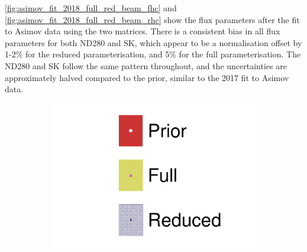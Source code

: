 \autoref{fig:asimov_fit_2018_full_red_beam_fhc} and \autoref{fig:asimov_fit_2018_full_red_beam_rhc} show the flux parameters after the fit to Asimov data using the two matrices. There is a consistent bias in all flux parameters for both ND280 and SK, which appear to be a normalisation offset by 1-2\% for the reduced parameterisation, and 5\% for the full parameterisation. The ND280 and SK follow the same pattern throughout, and the uncertainties are approximately halved compared to the prior, similar to the 2017 fit to Asimov data.

\begin{figure}[h]
	\centering
	\begin{subfigure}[t]{0.10\textwidth}
		\includegraphics[width=\textwidth,page=1, trim={0mm 0mm 0mm 9mm}, clip]{figures/mach3/2018/asimov/2018a_FixedCov_FullCov_Mpi_Asimov_merg_2018a_FixedCov_RedCov_Mpi_Asimov_merge}
	\end{subfigure}


\end{figure}
